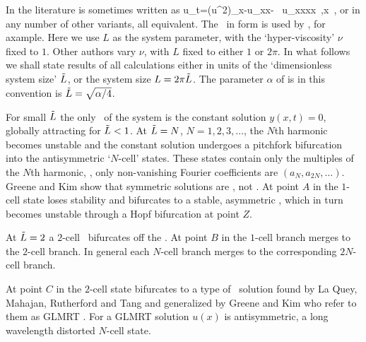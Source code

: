 In the literature  is sometimes written as
\beq
    u_t=(u^2)_x-u_{xx}- \nu \, u_{xxxx}
    \,,\qquad   x \in [0,L]
    \,,
or in any number of other variants, all equivalent.
The \KSe\ in  form  is used by
\cite{cross93,Mks86,ks04com}, for axample.
Here we use $L$ as the system parameter, with the
`hyper-viscosity' $\nu$ fixed to $1$.
Other authors vary  $\nu$, with $L$ fixed to either $1$ or $2\pi$.
In what follows we shall state results of all
calculations either in units of the `dimensionless system size' $\tilde{L}$,
or the system size $L = 2 \pi \tilde{L}$. The parameter $\alpha$
of  is in this convention is
$\tilde{L}=\sqrt{\alpha/4}$.


For small $\tilde{L}$ the only \eqv\ of the system is the
constant solution $y(x,t)=0$, globally attracting
for $\tilde{L}<1$. At $\tilde{L}=N$, $N=1,2,3, \dots$,
the $N$th harmonic becomes unstable and the constant solution
undergoes a pitchfork bifurcation into
the antisymmetric `$N$-cell' states.
These states contain only the multiples of the $N$th
harmonic, {\ie}, only non-vanishing Fourier coefficients
are $(a_N,a_{2N},\dots)$.
Greene and Kim show that symmetric solutions are \eqva, not \reqva.
At point $A$ in 
the $1$-cell state loses stability
and bifurcates to a stable,
asymmetric \reqv, which in turn becomes unstable
through a Hopf bifurcation at point $Z$.


At $\tilde{L}=2$ a $2$-cell \eqv\ bifurcates off the  \eqv.
At point $B$ in  the $1$-cell branch merges
to the $2$-cell branch.  In general each $N$-cell branch merges
to the corresponding $2N$-cell branch.

At point $C$ in 
the $2$-cell state bifurcates to a type of \eqv\ solution
found by La Quey, Mahajan, Rutherford and Tang
and generalized by Greene and Kim who refer to them as GLMRT \eqva.
For a GLMRT solution $u(x)$ is antisymmetric,
a long wavelength distorted $N$-cell state.

